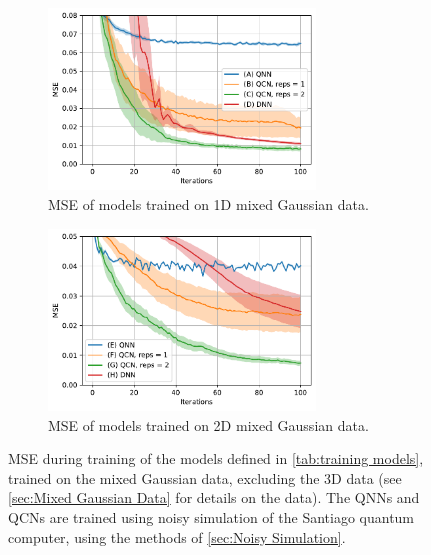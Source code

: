 \begin{figure}[H]
    \centering
    \begin{subfigure}[t]{0.45\textwidth}
        \centering
        \includegraphics[height=1.9in]{latex/figures/1D_gaussian_data_fit_noisy.pdf}
        \caption{MSE of models trained on 1D mixed Gaussian data.}
        
    \end{subfigure}%
    \hfill 
    \begin{subfigure}[t]{0.45\textwidth}
        \centering
        \includegraphics[height=1.9in]{latex/figures/2D_gaussian_data_fit_noisy.pdf}
        \caption{MSE of models trained on 2D mixed Gaussian data.}
    \end{subfigure}
    \caption{MSE during training of the models defined in \autoref{tab:training models}, trained on the mixed Gaussian data, excluding the 3D data (see \autoref{sec:Mixed Gaussian Data} for details on the data). The QNNs and QCNs are trained using noisy simulation of the Santiago quantum computer, using the methods of \autoref{sec:Noisy Simulation}.}
    \label{fig:trained noisy}
\end{figure}



